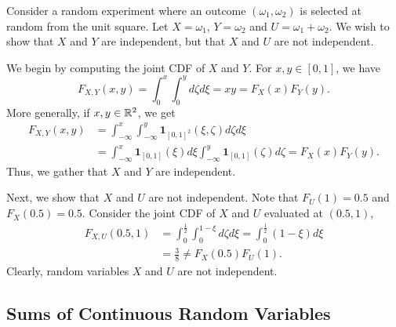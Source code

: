 \begin{example}
Consider a random experiment where an outcome $(\omega_1, \omega_2)$ is selected at random from the unit square.
Let $X = \omega_1$, $Y = \omega_2$ and $U = \omega_1 + \omega_2$.
We wish to show that $X$ and $Y$ are independent, but that $X$ and $U$ are not independent.

We begin by computing the joint CDF of $X$ and $Y$.
For $x,y \in [0,1]$, we have
\begin{equation*}
F_{X,Y}(x,y) = \int_0^{x} \int_0^{y} d\zeta d\xi
= x y = F_X(x) F_Y(y) .
\end{equation*}
More generally, if $x, y \in \mathbb{R}^2$, we get
\begin{equation*}
\begin{split}
F_{X,Y}(x,y)
&= \int_{-\infty}^{x} \int_{-\infty}^{y}
\mathbf{1}_{[0,1]^2} (\xi, \zeta) d\zeta d\xi \\
&= \int_{-\infty}^{x} \mathbf{1}_{[0,1]} (\xi) d \xi
\int_{-\infty}^{y} \mathbf{1}_{[0,1]} (\zeta) d\zeta
= F_X(x) F_Y(y) .
\end{split}
\end{equation*}
Thus, we gather that $X$ and $Y$ are independent.

Next, we show that $X$ and $U$ are not independent.
Note that $F_U (1) = 0.5$ and $F_X (0.5) = 0.5$.
Consider the joint CDF of $X$ and $U$ evaluated at $(0.5, 1)$,
\begin{equation*}
\begin{split}
F_{X,U} (0.5, 1)
&= \int_{0}^{\frac{1}{2}} \int_{0}^{1-\xi} d\zeta d\xi
= \int_{0}^{\frac{1}{2}} (1 - \xi) d\xi \\
&= \frac{3}{8}
\neq F_X (0.5) F_U(1) .
\end{split}
\end{equation*}
Clearly, random variables $X$ and $U$ are not independent.
\end{example}


\subsection{Sums of Continuous Random Variables}

